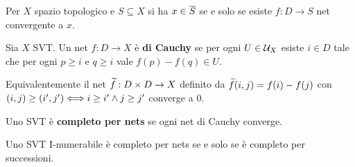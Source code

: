 \begin{exercise}
Per $X$ spazio topologico e $S\subseteq X$ si ha $x\in \overline{S}$ se e solo se esiste $f:D\to S$ net convergente a $x$.
\end{exercise}

\begin{definition}
Sia $X$ SVT. Un net $f:D\to X$ \`e \textbf{di Cauchy} se per ogni $U\in\mathcal{U}_X$ esiste $i\in D$ tale che per ogni $p\geq i$ e $q\geq i$ vale $f(p)-f(q)\in U$.

Equivalentemente il net $\widetilde{f}:D\times D\to X$ definito da $\widetilde{f}(i,j)=f(i)-f(j)$ con $(i,j)\geq(i',j')\Longleftrightarrow i\geq i'\wedge j\geq j'$ converge a $0$.
\end{definition}

\begin{definition}
Uno SVT \`e \textbf{completo per nets} se ogni net di Cauchy converge.
\end{definition}

\begin{exercise}
Uno SVT I-numerabile \`e completo per nets se e solo se \`e completo per successioni.
\end{exercise}